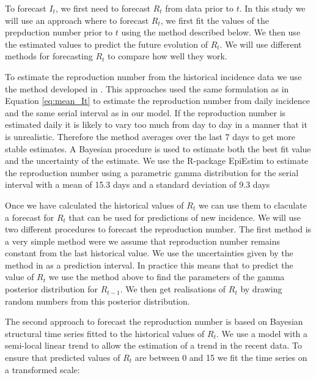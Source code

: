 \documentclass[12pt]{article}
\begin{document}

To forecast $I_t$, we first need to forecast $R_t$ from data prior to $t$. In this study we will use an approach where to forecast $R_t$, we first fit the values of the prepduction number prior to $t$ using the method described below. We then use the estimated values to predict the future evolution of $R_t$. We will use different methods for forecasting $R_t$ to compare how well they work. 

To estimate the reproduction number from the historical incidence data we use the method developed in \cite{coriNewFrameworkSoftware2013,thompsonImprovedInferenceTimevarying2019}. This approaches used the same formulation as in Equation \ref{eq:mean_It} to estimate the reproduction number from daily incidence and the same serial interval as in our model. If the reproduction number is estimated daily it is likely to vary too much from day to day in a manner that it is unrealistic. Therefore the method averages over the last 7 days to get more stable estimates. A Bayesian procedure is used to estimate both the best fit value and the uncertainty of the estimate. We use the R-package EpiEstim \cite{coriEpiEstimEpiEstimPackage2013} to estimate the reproduction number using a parametric gamma distribution for the serial interval with a mean of 15.3 days and a standard deviation of 9.3 days \cite{whoebolaresponseteamEbolaVirusDisease2014}

Once we have calculated the historical values of $R_t$ we can use them to claculate a forecast for $R_t$ that can be used for predictions of new incidence. We will use two different procedures to forecast the reproduction number. The first method is a very simple method were we assume that reproduction number remains constant from the last historical value. We use the uncertainties given by the method in \cite{coriNewFrameworkSoftware2013} as a prediction interval. In practice this means that to predict the value of $R_t$ we use the method above to find the parameters of the gamma posterior distribution for $R_{t-1}$. We then get realisations of $R_t$ by drawing random numbers from this posterior distribution. 

The second approach to forecast the reproduction number is based on Bayesian structural time series fitted to the historical values of $R_t$. We use a model with a semi-local linear trend to allow the estimation of a trend in the recent data. To ensure that predicted values of $R_t$ are between 0 and 15 we fit the time series on a transformed scale:
\end{document}
